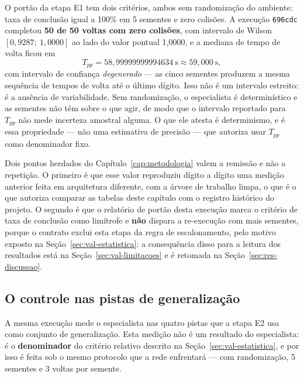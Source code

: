 O portão da etapa E1 tem dois critérios, ambos sem randomização do ambiente:
taxa de conclusão igual a 100\% em 5 sementes e zero colisões. A execução
\texttt{696cdc} completou \textbf{50 de 50 voltas com zero colisões}, com
intervalo de Wilson $[0{,}9287;\ 1{,}0000]$ ao lado do valor pontual 1,0000, e a
mediana de tempo de volta ficou em
\[
    T_{pp} = 58{,}99999999994634~\text{s} \approx 59{,}000~\text{s},
\]
com intervalo de confiança \textit{degenerado} --- as cinco sementes produzem a
mesma sequência de tempos de volta até o último dígito. Isso não é um intervalo
estreito: é a ausência de variabilidade. Sem randomização, o especialista é
determinístico e as sementes não têm sobre o que agir, de modo que o intervalo
reportado para $T_{pp}$ não mede incerteza amostral alguma. O que ele atesta é
determinismo, e é essa propriedade --- não uma estimativa de precisão --- que
autoriza usar $T_{pp}$ como denominador fixo.

Dois pontos herdados do Capítulo~\ref{cap:metodologia} valem a remissão e não a
repetição. O primeiro é que esse valor reproduziu dígito a dígito uma medição
anterior feita em arquitetura diferente, com a árvore de trabalho limpa, o que é
o que autoriza comparar as tabelas deste capítulo com o registro histórico do
projeto. O segundo é que o relatório de portão desta execução marca o critério de
taxa de conclusão como limítrofe e \textbf{não} dispara a re-execução com mais
sementes, porque o contrato exclui esta etapa da regra de escalonamento, pelo
motivo exposto na Seção~\ref{sec:val-estatistica}: a
consequência disso para a leitura dos resultados está na
Seção~\ref{sec:val-limitacoes} e é retomada na Seção~\ref{sec:res-discussao}.

\subsection{O controle nas pistas de generalização}

A mesma execução mede o especialista nas quatro pistas que a etapa E2 usa como
conjunto de generalização. Esta medição não é um resultado do especialista: é o
\textbf{denominador} do critério relativo descrito na
Seção~\ref{sec:val-estatistica}, e por isso é feita sob o mesmo protocolo que a
rede enfrentará --- com randomização, 5 sementes e 3 voltas por semente.

